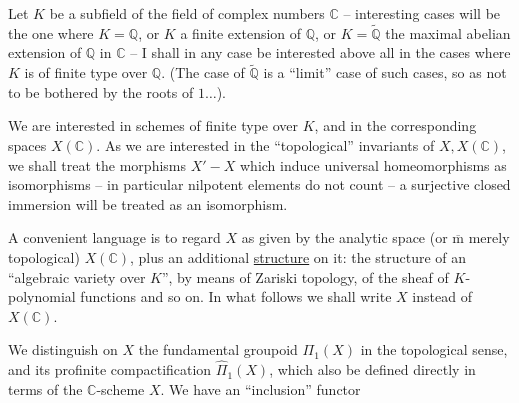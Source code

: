 Let $K$ be a subfield of the field of complex numbers $\mathbb C$ -- interesting cases will be the one where $K=\mathbb Q$, or $K$ a finite extension of $\mathbb Q$, or $K=\widetilde{\mathbb Q}$ the maximal abelian extension of $\mathbb Q$ in $\mathbb C$ -- I shall in any case be interested above all in the cases where $K$ is of finite type over $\mathbb Q$. (The case of $\widetilde{\mathbb Q}$ is a ``limit'' case of such cases, so as not to be bothered by the roots of $1\ldots$).

We are interested in schemes  of finite type over $K$, and in the corresponding  spaces $X(\mathbb C)$. As we are interested in the ``topological'' invariants of $X,X(\mathbb C)$, we shall treat the morphisms $X'-X$ which induce universal homeomorphisms as isomorphisms -- in particular nilpotent elements do not count -- a surjective closed immersion will be treated as an isomorphism.

A convenient language is to regard $X$ as given by the analytic space (or $\overline{\mathrm m}$ merely topological) $X(\mathbb C)$, plus an additional \uline{structure} on it: the structure of an ``algebraic variety over $K$'', by means of Zariski topology, of the sheaf of $K$-polynomial functions and so on. In what follows we shall write $X$ instead of $X(\mathbb C)$.

We distinguish on $X$ the fundamental groupoid $\Pi_1(X)$ in the topological sense, and its profinite compactification $\widehat\Pi_1(X)$, which   also be defined directly in terms of the $\mathbb C$-scheme $X$. We have an ``inclusion'' functor
